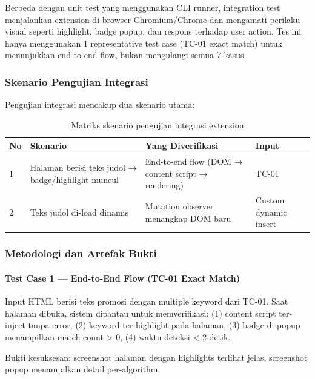 Berbeda dengan unit test yang menggunakan CLI runner, integration test menjalankan extension di browser Chromium/Chrome
dan mengamati perilaku visual seperti highlight, badge popup, dan respons terhadap user action. Tes ini hanya menggunakan
1 representative test case (TC-01 exact match) untuk menunjukkan end-to-end flow, bukan mengulangi semua 7 kasus.

\subsubsection{Skenario Pengujian Integrasi}

Pengujian integrasi mencakup dua skenario utama:

\begin{table}[H]
  \centering
  \renewcommand{\arraystretch}{1.2}
  \begin{tabular}{|p{2cm}|p{3cm}|p{4cm}|p{2cm}|}
    \hline
    \textbf{No} & \textbf{Skenario}                                  & \textbf{Yang Diverifikasi}                         & \textbf{Input}        \\
    \hline
    1           & Halaman berisi teks judol → badge/highlight muncul & End-to-end flow (DOM → content script → rendering) & TC-01                 \\
    \hline
    2           & Teks judol di-load dinamis                         & Mutation observer menangkap DOM baru               & Custom dynamic insert \\
    \hline
  \end{tabular}
  \caption{Matriks skenario pengujian integrasi extension}
\end{table}

\subsubsection{Metodologi dan Artefak Bukti}

\paragraph{Test Case 1 — End-to-End Flow (TC-01 Exact Match)}
Input HTML berisi teks promosi dengan multiple keyword dari TC-01. Saat halaman dibuka, sistem dipantau untuk memverifikasi:
(1) content script ter-inject tanpa error, (2) keyword ter-highlight pada halaman, (3) badge di popup menampilkan match count > 0, (4) waktu deteksi < 2 detik.

Bukti kesuksesan: screenshot halaman dengan highlights terlihat jelas, screenshot popup menampilkan detail per-algorithm.

